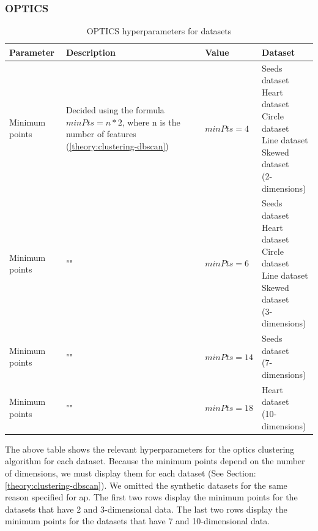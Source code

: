 \subsubsection{OPTICS}

\begin{table}[h]
  \begin{tabular}{|l|p{6cm}|l|l|}
    \hline
    Parameter      & Description                                                                                                    & Value       & Dataset                    \\
    \hline
    Minimum points & Decided using the formula $minPts = n * 2$, where n is the number of features (\ref{theory:clustering-dbscan}) & $minPts=4$  & \makecell[l]{Seeds dataset \\ Heart dataset \\ Circle dataset \\ Line dataset \\ Skewed dataset \\ (2-dimensions)}  \\
    \hline
    Minimum points & ""                                                                                                             & $minPts=6$  & \makecell[l]{Seeds dataset \\ Heart dataset \\ Circle dataset \\ Line dataset \\ Skewed dataset \\ (3-dimensions)} \\
    \hline
    Minimum points & ""                                                                                                             & $minPts=14$ & \makecell[l]{Seeds dataset \\ (7-dimensions)}  \\
    \hline
    Minimum points & ""                                                                                                             & $minPts=18$ & \makecell[l]{Heart dataset \\ (10-dimensions)} \\
    \hline
  \end{tabular}
  \caption{OPTICS  hyperparameters for datasets}
  \label{tab:dbscan-formula-sklearn}
\end{table}
The above table shows the relevant hyperparameters for the \gls{optics} clustering algorithm for each dataset.
Because the minimum points depend on the number of dimensions, we must display them for each dataset (See Section: \ref{theory:clustering-dbscan}).
We omitted the synthetic datasets for the same reason specified for \gls{ap}.
The first two rows display the minimum points for the datasets that have 2 and 3-dimensional data.
The last two rows display the minimum points for the datasets that have 7 and 10-dimensional data.
\newpage
